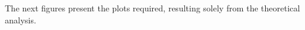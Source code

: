   The next figures present the plots required, resulting solely from the theoretical analysis.



  \centering









\pagebreak


